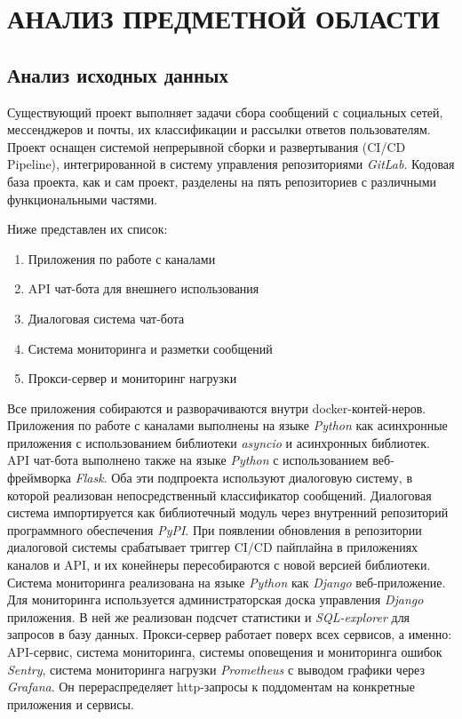 \section{АНАЛИЗ ПРЕДМЕТНОЙ ОБЛАСТИ}
    \subsection{Анализ исходных данных}
    Существующий проект выполняет задачи сбора сообщений с социальных сетей, мессенджеров и почты,
    их классификации и рассылки ответов пользователям.
    Проект оснащен системой непрерывной сборки и развертывания (CI/CD Pipeline), интегрированной в
    систему управления репозиториями \textit{GitLab}.
    Кодовая база проекта, как и сам проект, разделены на пять репозиториев с различными
    функциональными частями.
    
    Ниже представлен их список:
    \begin{enumerate}
        \item Приложения по работе с каналами
        \item API чат-бота для внешнего использования
        \item Диалоговая система чат-бота
        \item Система мониторинга и разметки сообщений
        \item Прокси-сервер и мониторинг нагрузки
    \end{enumerate}
    
    Все приложения собираются и разворачиваются внутри docker-контей-неров.
    Приложения по работе с каналами выполнены на языке \textit{Python} как асинхронные приложения
    с использованием библиотеки \textit{asyncio} и асинхронных библиотек.
    API чат-бота выполнено также на языке \textit{Python} с использованием веб-фреймворка \textit{Flask}.
    Оба эти подпроекта используют диалоговую систему, в которой реализован непосредственный
    классификатор сообщений.
    Диалоговая система импортируется как библиотечный модуль через внутренний репозиторий
    программного обеспечения \textit{PyPI}.
    При появлении обновления в репозитории диалоговой системы срабатывает триггер CI/CD пайплайна
    в приложениях каналов и API, и их конейнеры пересобираются с новой версией библиотеки.
    Система мониторинга реализована на языке \textit{Python} как \textit{Django} веб-приложение.
    Для мониторинга используется администраторская доска управления \textit{Django} приложения.
    В ней же реализован подсчет статистики и \textit{SQL-explorer} для запросов в базу данных.
    Прокси-сервер работает поверх всех сервисов, а именно: API-сервис, система мониторинга,
    системы оповещения и мониторинга ошибок \textit{Sentry}, система мониторинга нагрузки \textit{Prometheus}
    с выводом графики через \textit{Grafana}. Он перераспределяет http-запросы к поддоментам на конкретные
    приложения и сервисы.

